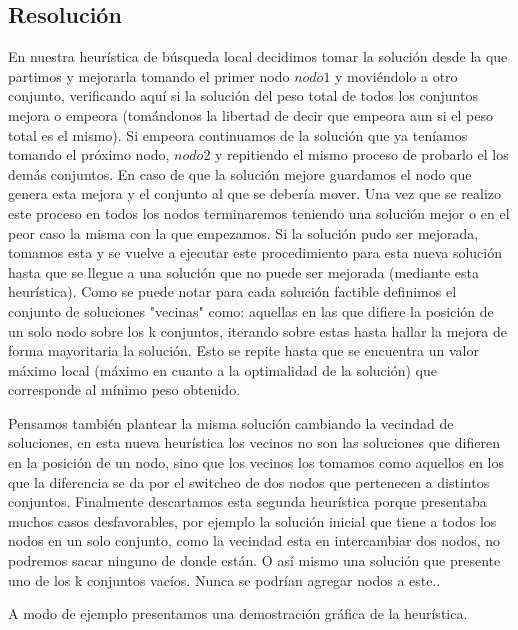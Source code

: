 \subsection{Resoluci\'on}

En nuestra heurística de búsqueda local decidimos tomar la solución desde la que partimos y mejorarla tomando el primer nodo $nodo1$ y moviéndolo a otro conjunto, verificando aquí si la solución del peso total de todos los conjuntos mejora o empeora (tomándonos la libertad de decir que empeora aun si el peso total es el mismo). Si empeora continuamos de la solución que ya teníamos tomando el próximo nodo, $nodo2$ y repitiendo el mismo proceso de probarlo el los demás conjuntos. En caso de que la solución mejore guardamos el nodo que genera esta mejora y el conjunto al que se debería mover. Una vez que se realizo este proceso en todos los nodos terminaremos teniendo una solución mejor o en el peor caso la misma con la que empezamos.
Si la solución pudo ser mejorada, tomamos esta y se vuelve a ejecutar este procedimiento para esta nueva solución hasta que se llegue a una solución que no puede ser mejorada (mediante esta heurística).
Como se puede notar para cada solución factible definimos el conjunto de soluciones "vecinas" como: aquellas en las que difiere la posición de un solo nodo sobre los k conjuntos, iterando sobre estas hasta hallar la mejora de forma mayoritaria la solución. Esto se repite hasta que se encuentra un valor máximo local (máximo en cuanto a la optimalidad de la solución) que corresponde al mínimo peso obtenido.

Pensamos también plantear la misma solución cambiando la vecindad de soluciones, en esta nueva heurística los vecinos no son las soluciones que difieren en la posición de un nodo, sino que los vecinos los tomamos como aquellos en los que la diferencia se da por el switcheo de dos nodos que pertenecen a distintos conjuntos.
Finalmente descartamos esta segunda heurística porque presentaba muchos casos desfavorables, por ejemplo la solución inicial que tiene a todos los nodos en un solo conjunto, como la vecindad esta en intercambiar dos nodos, no podremos sacar ninguno de donde están. O así mismo una solución que presente uno de los k conjuntos vacíos. Nunca se podrían agregar nodos a este..

A modo de ejemplo presentamos una demostración gráfica de la heurística.


